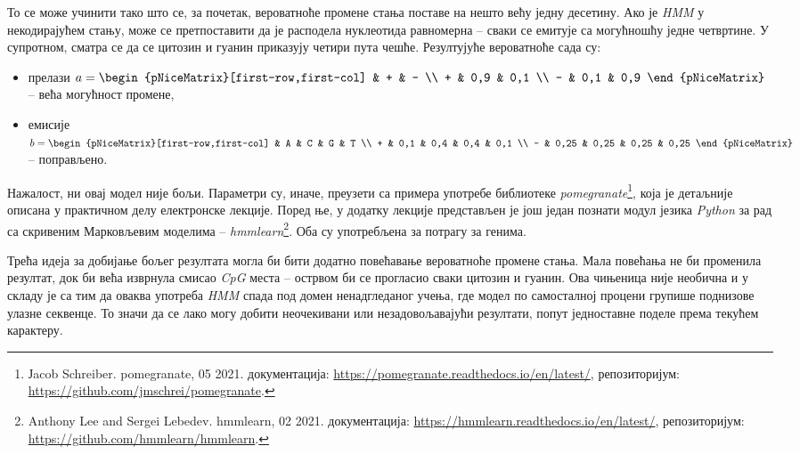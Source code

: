 \documentclass[12pt,oneside]{memoir}
\begin{document}
\begin{CJK}{UTF8}{ipxm}
То се може учинити тако што се, за почетак, вероватноће промене стања поставе на нешто већу једну десетину. Ако је \textit{HMM} у некодирајућем стању, може се претпоставити да је расподела нуклеотида равномерна -- сваки се емитује са могућношћу једне четвртине. У супротном, сматра се да се цитозин и гуанин приказују четири пута чешће. Резултујуће вероватноће сада су:
\begin{itemize}
  \item прелази $a = \begin{pNiceMatrix}[first-row,first-col] & + & - \\ + & 0,9 & 0,1 \\ - & 0,1 & 0,9 \end{pNiceMatrix}$ -- већа могућност промене,
  \item емисије $b = \begin{pNiceMatrix}[first-row,first-col] & A & C & G & T \\ + & 0,1 & 0,4 & 0,4 & 0,1 \\ - & 0,25 & 0,25 & 0,25 & 0,25 \end{pNiceMatrix}$ -- поправљено.
\end{itemize}

Нажалост, ни овај модел није бољи. Параметри су, иначе, преузети са примера употребе библиотеке \textit{pomegranate}\footnote{Јacob Schreiber. pomegranate, 05 2021. документација: \url{https://pomegranate.readthedocs.io/en/latest/}, репозиторијум: \url{https://github.com/jmschrei/pomegranate}.}, која је детаљније описана у практичном делу електронске лекције. Поред ње, у додатку лекције представљен је још један познати модул језика \textit{Python} за рад са скривеним Марковљевим моделима -- \textit{hmmlearn}\footnote{Anthony Lee and Sergei Lebedev. hmmlearn, 02 2021. документација: \url{https://hmmlearn.readthedocs.io/en/latest/}, репозиторијум: \url{https://github.com/hmmlearn/hmmlearn}.}. Оба су употребљена за потрагу за генима.

Трећа идеја за добијање бољег резултата могла би бити додатно повећавање вероватноће промене стања. Мала повећања не би променила резултат, док би већа изврнула смисао \textit{CpG} места -- острвом би се прогласио сваки цитозин и гуанин. Ова чињеница није необична и у складу је са тим да оваква употреба \textit{HMM} спада под домен ненадгледаног учења, где модел по самосталној процени групише поднизове улазне секвенце. То значи да се лако могу добити неочекивани или незадовољавајући резултати, попут једноставне поделе према текућем карактеру.


\end{CJK}
\end{document}
